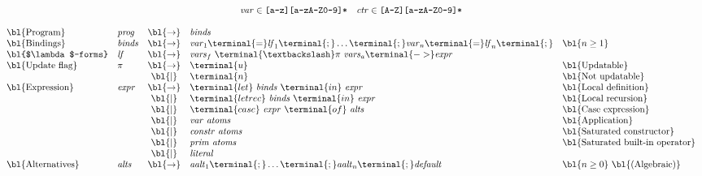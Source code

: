 \documentclass[10pt,a4paper]{exam} %
\begin{document}
\begin{figure}[h]
\begin{mdframed}
    \begin{displaymath}
    \begin{array}{llcll}
    \multicolumn{5}{c}{\begin{array}{cc}
    \mathit{var} \in \texttt{[a-z][a-zA-Z0-9]*} & \mathit{ctr} \in \texttt{[A-Z][a-zA-Z0-9]*}
    \end{array}}\\\\
    \text{\bl{Program}} & \mathit{prog} & \bl{\to} & \mathit{binds} \\
    \text{\bl{Bindings}} & \mathit{binds} & \bl{\to} & \mathit{var}_1 \terminal{ = } \mathit{lf}_1\terminal{;} \ldots \terminal{;} \mathit{var}_n \terminal{ = } \mathit{lf}_n\terminal{;} & \bl{n \ge 1}\\
    \text{\bl{$\lambda$-forms}} & \mathit{lf} & \bl{\to} & \mathit{vars}_f~\terminal{\textbackslash} \pi~\mathit{vars}_a \terminal{ -> } \mathit{expr} \\
    \text{\bl{Update flag}} & \pi & \bl{\to} & \terminal{u} & \text{\bl{Updatable}} \\
    &     & \bl{\mid}     & \terminal{n} & \text{\bl{Not updatable}} \\
    \text{\bl{Expression}} & \mathit{expr} & \bl{\to}  & \terminal{let}~\mathit{binds}~\terminal{in}~\mathit{expr} & \text{\bl{Local definition}} \\
    &               & \bl{\mid} & \terminal{letrec}~\mathit{binds}~\terminal{in}~\mathit{expr} & \text{\bl{Local recursion}} \\
    &               & \bl{\mid} & \terminal{case}~\mathit{expr}~\terminal{of}~\mathit{alts} & \text{\bl{Case expression}} \\
    &               & \bl{\mid} & \mathit{var}~\mathit{atoms} & \text{\bl{Application}} \\
    &               & \bl{\mid} & \mathit{constr}~\mathit{atoms} & \text{\bl{Saturated constructor}} \\
    &               & \bl{\mid} & \mathit{prim}~\mathit{atoms} & \text{\bl{Saturated built-in operator}} \\
    &               & \bl{\mid} & \mathit{literal}  \\
    \text{\bl{Alternatives}} & \mathit{alts} & \bl{\to}  & \mathit{aalt}_1 \terminal{;} \ldots \terminal{;} \mathit{aalt}_n \terminal{;} \mathit{default} & \bl{n \ge 0} \text{ \bl{(Algebraic)}} \\

\end{array}
\end{displaymath}
\end{mdframed}
\end{figure}
\end{document}
